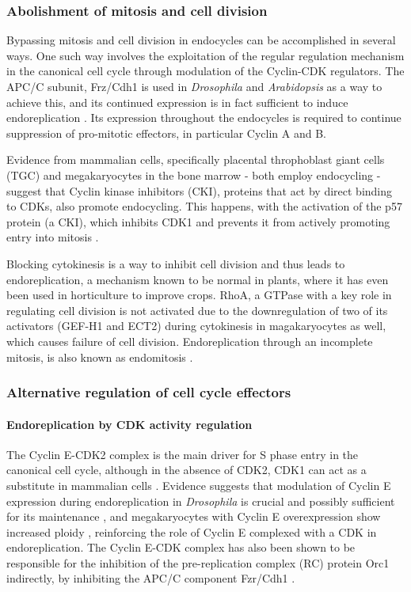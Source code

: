 \documentclass[11pt,twoside,a4paper]{report}
\begin{document}
				\subsubsection{Abolishment of mitosis and cell division}
				Bypassing mitosis and cell division in endocycles can be accomplished in several ways. One such way involves the exploitation of the regular regulation mechanism in the canonical cell cycle through modulation of the Cyclin-CDK regulators. 
				The APC/C subunit, Frz/Cdh1 is used in \textit{Drosophila} and \textit{Arabidopsis} as a way to achieve this, and its continued expression is in fact sufficient to induce endoreplication \cite{Zielke2011}. Its expression throughout the endocycles is required to continue suppression of pro-mitotic effectors, in particular Cyclin A and B.
				
				Evidence from mammalian cells, specifically placental throphoblast giant cells (TGC) and megakaryocytes in the bone marrow - both employ endocycling - suggest that Cyclin kinase inhibitors (CKI), proteins that act by direct binding to CDKs, also promote endocycling. This happens, with the activation of the p57 protein (a CKI), which inhibits CDK1 and prevents it from actively promoting entry into mitosis \cite{Besson2008}.	
				
			 	Blocking cytokinesis is a way to inhibit cell division and thus leads to endoreplication, a mechanism known to be normal in plants, where it has even been used in horticulture to improve crops. RhoA, a GTPase with a key role in regulating cell division is not activated due to the downregulation of two of its activators (GEF-H1 and ECT2) during cytokinesis in magakaryocytes as well, which causes failure of cell division. Endoreplication through an incomplete mitosis, is also known as endomitosis \cite{Fox2013}.
			
			\subsubsection{Alternative regulation of cell cycle effectors}
			
				\paragraph{Endoreplication by CDK activity regulation}
				
				The Cyclin E-CDK2 complex is the main driver for S phase entry in the canonical cell cycle, although in the absence of CDK2, CDK1 can act as a substitute in mammalian cells \cite{Ullah2009}. Evidence suggests that modulation of Cyclin E expression during endoreplication in \textit{Drosophila} is crucial and possibly sufficient for its maintenance \cite{Lilly2005}, and megakaryocytes with Cyclin E overexpression show increased ploidy \cite{Eliades2010}, reinforcing the role of Cyclin E complexed with a CDK in endoreplication. The Cyclin E-CDK complex has also been shown to be responsible for the inhibition of the pre-replication complex (RC) protein Orc1 indirectly, by inhibiting the APC/C component Fzr/Cdh1 \cite{Narbonne-Reveau2008}.
			
\end{document}
